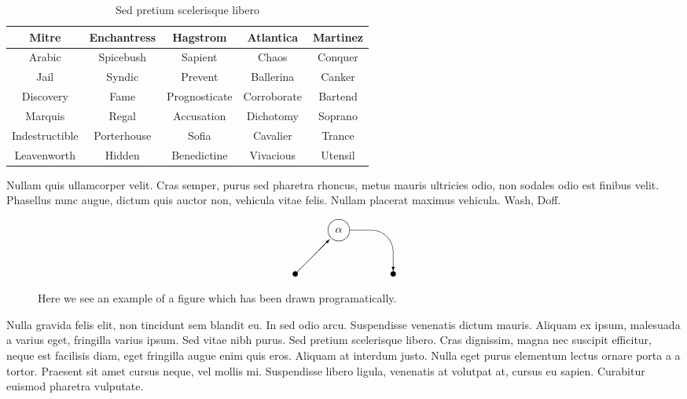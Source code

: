 \begin{table}
\centering
\begin{tabular}{|ccccc|}
\hline
\textbf{Mitre} & \textbf{Enchantress} & \textbf{Hagstrom} &
\textbf{Atlantica} & \textbf{Martinez} \\
\hline
Arabic & Spicebush & Sapient & Chaos & Conquer \\
Jail & Syndic & Prevent & Ballerina & Canker \\
Discovery & Fame & Prognosticate & Corroborate & Bartend \\
Marquis & Regal & Accusation & Dichotomy & Soprano \\
Indestructible  & Porterhouse & Sofia & Cavalier & Trance \\
Leavenworth & Hidden & Benedictine & Vivacious & Utensil \\
\hline
\end{tabular}
\caption{Sed pretium scelerisque libero}
\end{table}

Nullam quis ullamcorper velit. Cras semper, purus sed pharetra rhoncus, metus mauris ultricies odio, non sodales odio est finibus velit. Phasellus nunc augue, dictum quis auctor non, vehicula vitae felis. Nullam placerat maximus vehicula. Wash\cite{cmusic}, Doff.

\begin{figure}
\[ \begin{picture}(90,50)
  \put(0,0){\circle*{5}}
  \put(0,0){\vector(1,1){31.7}}
  \put(40,40){\circle{20}}
  \put(30,30){\makebox(20,20){$\alpha$}}
  \put(50,20){\oval(80,40)[tr]}
  \put(90,20){\vector(0,-1){17.5}}
  \put(90,0){\circle*{5}}
\end{picture}
 \]
\caption{Here we see an example of a figure which has been drawn programatically.}
\end{figure}

Nulla gravida felis elit, non tincidunt sem blandit eu. In sed odio arcu. Suspendisse venenatis dictum mauris. Aliquam ex ipsum, malesuada a varius eget, fringilla varius ipsum. Sed vitae nibh purus. Sed pretium scelerisque libero. Cras dignissim, magna nec suscipit efficitur, neque est facilisis diam, eget fringilla augue enim quis eros. Aliquam at interdum justo. Nulla eget purus elementum lectus ornare porta a a tortor. Praesent sit amet cursus neque, vel mollis mi. Suspendisse libero ligula, venenatis at volutpat at, cursus eu sapien. Curabitur euismod pharetra vulputate.

